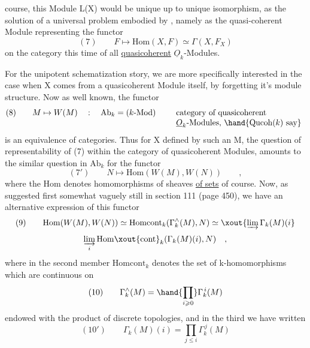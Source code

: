 course,  this Module L(X)  would be unique up to unique isomorphism,  as
the solution of a universal problem embodied by ,  namely as the
quasi-coherent Module representing the functor
\[ (7) \qquad F \longmapsto \mathrm{Hom}(X,F) \simeq \Gamma(X,F_X) \]
on the category this time of all \uline{quasicoherent} $\underline{O}_k$-Modules.

For the unipotent schematization story,  we are more specifically
interested in the case when X comes from a quasicoherent Module itself,
by forgetting it's module structure.  Now  as well known,  the
functor
\[ (8) \qquad M \mapsto W(M) \quad : \quad \mathrm{Ab}_k = (k\text{-Mod}) \qquad \begin{array}[t]{l} \text{category of quasicoherent} \\ \underline{O}_k\text{-Modules, } \hand{\mathrm{Qucoh}(k) \text{ say}} \end{array} \]
is an equivalence of categories.  Thus for X defined by such an M,  the
question of representability of (7)  within the category of quasicoherent
Modules,  amounts to the similar question in $\mathrm{Ab}_k$  for the functor
\[ (7') \qquad N \longmapsto \mathrm{Hom}(W(M),W(N)) \qquad , \]
where the Hom denotes homomorphisms of sheaves \uline{of sets} of course.  Now,
as suggested first\hand{,} somewhat vaguely still\hand{,} in section 111 (page 450),
we have an alternative expression of this functor\hand{,}  
\[ (9) \qquad \mathrm{Hom}(W(M),W(N)) \simeq \mathrm{Homcont}_k(\Gamma_k^{\wedge}(M),N) \simeq \xout{\varinjlim \Gamma_k(M)(i} \]
 
\[ \varinjlim_{i} \mathrm{Hom}\xout{\mathrm{cont}}_k(\Gamma_k(M)(i),N) \quad , \]
where in the second member $\mathrm{Homcont}_k$ denotes the set of k-homomorphisms
which are continuous  on
\[ (10) \qquad \Gamma_k^{\wedge}(M) = \hand{\prod_{i \geqslant 0}} \Gamma_k^{\,i}(M) \]
\unsure{(}endowed with the product of discrete topologies\unsure{)},  and in the third
we have written
\[ (10') \qquad \Gamma_k(M)(i) = \prod_{j \leqslant i} \Gamma_k^{\,j}(M) \]
